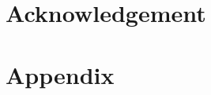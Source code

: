 \documentclass[review,oneside]{igs}
\begin{document}
\section{Acknowledgement}



\section{Appendix}

\renewcommand{\thefigure}{A\arabic{figure}}
\setcounter{figure}{0}

%
%
\end{document}
